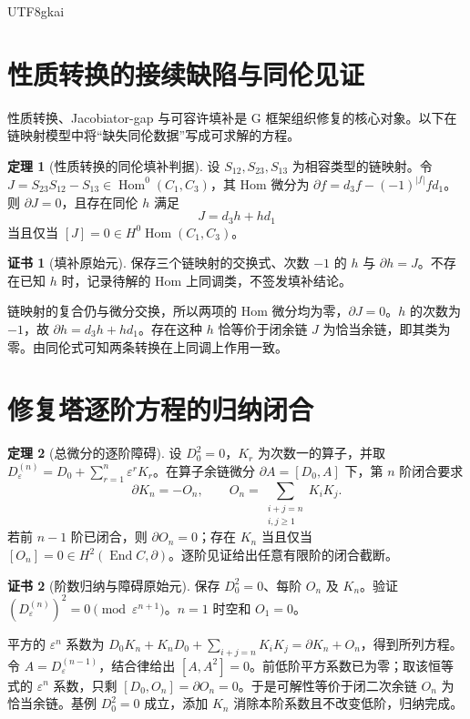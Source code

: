 \documentclass[12pt]{report}
\makeatletter
\theoremstyle{definition}
\newtheorem{theorem}{定理}[chapter]
\newtheorem{Certificate}{证书}[chapter]
\renewenvironment{proof}[1][\proofname]{\par
  \pushQED{\qed}\normalfont
  \topsep6\p@\@plus6\p@\relax
  \trivlist
  \item[\hskip\labelsep\normalfont #1\@addpunct{.}]\ignorespaces
}{
  \popQED\endtrivlist\@endpefalse
}
\newcommand{\End}{\operatorname{End}}
\newcommand{\Hom}{\operatorname{Hom}}
\makeatother
\begin{document}
\begin{CJK*}{UTF8}{gkai}
\section{性质转换的接续缺陷与同伦见证}
性质转换、Jacobiator-gap 与可容许填补是 G 框架组织修复的核心对象\cite{pure,app3}。以下在链映射模型中将“缺失同伦数据”写成可求解的方程。
\begin{theorem}[性质转换的同伦填补判据]
\label{thm:filler}
设 \(S_{12},S_{23},S_{13}\) 为相容类型的链映射。令
\(J=S_{23}S_{12}-S_{13}\in\Hom^0(C_1,C_3)\)，其 Hom 微分为
\(\partial f=d_3f-(-1)^{|f|}fd_1\)。则 \(\partial J=0\)，且存在同伦 \(h\) 满足
\[
J=d_3h+hd_1
\]
当且仅当 \([J]=0\in H^0\Hom(C_1,C_3)\)。
\end{theorem}
\begin{Certificate}[填补原始元]
保存三个链映射的交换式、次数 \(-1\) 的 \(h\) 与 \(\partial h=J\)。不存在已知 \(h\) 时，记录待解的 Hom 上同调类，不签发填补结论。
\end{Certificate}
\begin{proof}
链映射的复合仍与微分交换，所以两项的 Hom 微分均为零，\(\partial J=0\)。\(h\) 的次数为 \(-1\)，故 \(\partial h=d_3h+hd_1\)。存在这种 \(h\) 恰等价于闭余链 \(J\) 为恰当余链，即其类为零。由同伦式可知两条转换在上同调上作用一致。
\end{proof}

\section{修复塔逐阶方程的归纳闭合}
\begin{theorem}[总微分的逐阶障碍]
\label{thm:repairtower}
设 \(D_0^2=0\)，\(K_r\) 为次数一的算子，并取
\(D^{(n)}_\varepsilon=D_0+\sum_{r=1}^n\varepsilon^rK_r\)。在算子余链微分 \(\partial A=[D_0,A]\) 下，第 \(n\) 阶闭合要求
\begin{equation}\label{eq:towerrepair}
\partial K_n=-O_n,\qquad
O_n=\sum_{\substack{i+j=n\\i,j\ge1}}K_iK_j.
\end{equation}
若前 \(n-1\) 阶已闭合，则 \(\partial O_n=0\)；存在 \(K_n\) 当且仅当 \([O_n]=0\in H^2(\End C,\partial)\)。逐阶见证给出任意有限阶的闭合截断。
\end{theorem}
\begin{Certificate}[阶数归纳与障碍原始元]
保存 \(D_0^2=0\)、每阶 \(O_n\) 及 \(K_n\)。验证
\((D^{(n)}_\varepsilon)^2=0\pmod{\varepsilon^{n+1}}\)。\(n=1\) 时空和 \(O_1=0\)。
\end{Certificate}
\begin{proof}
平方的 \(\varepsilon^n\) 系数为
\(D_0K_n+K_nD_0+\sum_{i+j=n}K_iK_j=\partial K_n+O_n\)，得到所列方程。令 \(A=D^{(n-1)}_\varepsilon\)，结合律给出 \([A,A^2]=0\)。前低阶平方系数已为零；取该恒等式的 \(\varepsilon^n\) 系数，只剩 \([D_0,O_n]=\partial O_n=0\)。于是可解性等价于闭二次余链 \(O_n\) 为恰当余链。基例 \(D_0^2=0\) 成立，添加 \(K_n\) 消除本阶系数且不改变低阶，归纳完成。
\end{proof}


\end{CJK*}
\end{document}
